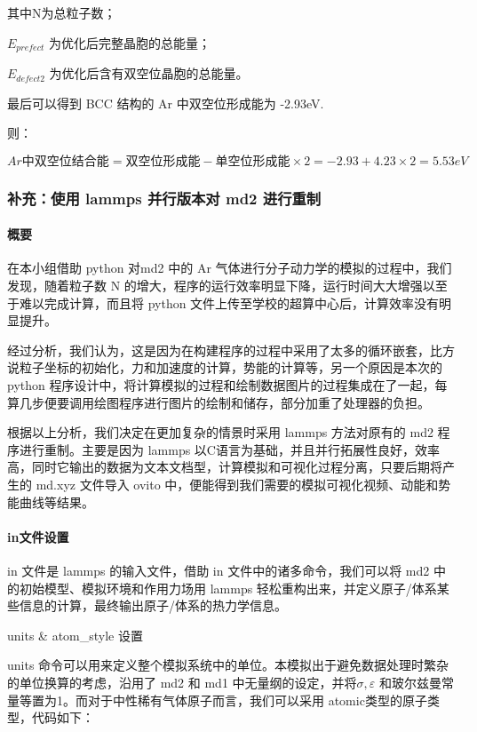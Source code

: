 \documentclass[
]{article}
\begin{document}
其中N为总粒子数；

\(E_{prefect}\) 为优化后完整晶胞的总能量；

\(E_{defect2}\) 为优化后含有双空位晶胞的总能量。

最后可以得到 BCC 结构的 Ar 中双空位形成能为 -2.93eV.

则：

\[Ar 中双空位结合能 = 双空位形成能 - 单空位形成能×2 = -2.93+4.23×2 = 5.53eV\]

\hypertarget{header-n116}{%
\subsubsection{补充：使用 lammps 并行版本对 md2
进行重制}\label{header-n116}}

\hypertarget{header-n117}{%
\paragraph{概要}\label{header-n117}}

在本小组借助 python 对md2 中的 Ar
气体进行分子动力学的模拟的过程中，我们发现，随着粒子数 N
的增大，程序的运行效率明显下降，运行时间大大增强以至于难以完成计算，而且将
python 文件上传至学校的超算中心后，计算效率没有明显提升。

经过分析，我们认为，这是因为在构建程序的过程中采用了太多的循环嵌套，比方说粒子坐标的初始化，力和加速度的计算，势能的计算等，另一个原因是本次的
python
程序设计中，将计算模拟的过程和绘制数据图片的过程集成在了一起，每算几步便要调用绘图程序进行图片的绘制和储存，部分加重了处理器的负担。

根据以上分析，我们决定在更加复杂的情景时采用 lammps 方法对原有的 md2
程序进行重制。主要是因为 lammps
以C语言为基础，并且并行拓展性良好，效率高，同时它输出的数据为文本文档型，计算模拟和可视化过程分离，只要后期将产生的
md.xyz 文件导入 ovito
中，便能得到我们需要的模拟可视化视频、动能和势能曲线等结果。

\hypertarget{header-n121}{%
\paragraph{in文件设置}\label{header-n121}}

in 文件是 lammps 的输入文件，借助 in 文件中的诸多命令，我们可以将 md2
中的初始模型、模拟环境和作用力场用 lammps
轻松重构出来，并定义原子/体系某些信息的计算，最终输出原子/体系的热力学信息。

units \& atom\_style 设置

units
命令可以用来定义整个模拟系统中的单位。本模拟出于避免数据处理时繁杂的单位换算的考虑，沿用了
md2 和 md1 中无量纲的设定，并将\(\sigma,\varepsilon\)
和玻尔兹曼常量等置为1。而对于中性稀有气体原子而言，我们可以采用
atomic类型的原子类型，代码如下：
\end{document}
